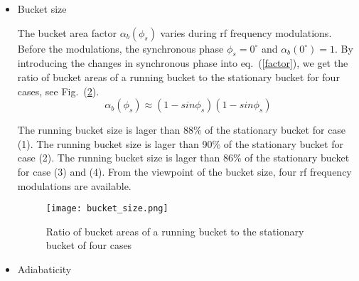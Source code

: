 \begin{itemize}
The rf frequency modulations make the synchronous phase deviate from the norminal value $0^\circ$. Fig.~\ref{synch_phase} shows the changes in the synchronous phase, $\Delta \phi_s$ (t). It is calculated by introducing values into eq.~(\ref{?}). For case (1), the phase jumps in $\Delta \phi_s(t)$ appear at the start and end of the frequency modulation, and at two points where the slope of modulation changes from upward to flat and from flat to downward. For case (2), the phase jumps in $\Delta \phi_s(t)$ appear at the start and end of the frequency modulation, and at the midpoint where the slope of modulation changes from upward to downward. For case (3) and (4), the  synchronous phase $\Delta \phi_s(t)$ during the modulations are continous. The phase jumps are dangerous for the beam to follow. From the view point of the synchronous phase, four cases of rf frequency modulations are available.
\begin{figure}[!htb]
   \centering   
   \texttt{[image: synch\_phase.png]}
   \caption{Changes in synchronous phase of four cases}
   \label{synch_phase}
\end{figure}
\item Bucket size

The bucket area factor $\alpha_b (\phi_s) $ varies during rf frequency modulations. Before the modulations, the synchronous phase $\phi_s=0^\circ$ and  $\alpha_b(0^\circ) = 1$. By introducing the changes in synchronous phase into eq.~(\ref{factor}), we get the ratio of bucket areas of a running bucket to the stationary bucket for four cases, see Fig.~(\ref{bucket_size}).
\begin{equation}
\alpha_b (\phi_s) \approx (1-sin \phi_s)(1-sin \phi_s)\label{factor}
\end{equation}

 The running bucket size is lager than 88$\%$ of the stationary bucket for case (1). The running bucket size is lager than 90$\%$ of the stationary bucket for case (2). The running bucket size is lager than 86$\%$ of the stationary bucket for case (3) and (4). From the viewpoint of the bucket size, four rf frequency modulations are available.  

\begin{figure}[!htb]
   \centering   
   \texttt{[image: bucket\_size.png]}
   \caption{Ratio of bucket areas of a running bucket to the stationary bucket of four cases}
   \label{bucket_size}
\end{figure}
\item Adiabaticity


\end{itemize}
